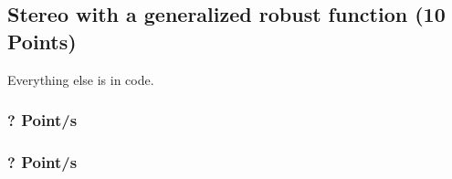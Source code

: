 \newif\ifvimbug
\vimbugfalse

\ifvimbug

\fi


\subsection{Stereo with a generalized robust function (10 Points)}
\setcounter{subsubsection}{4}
Everything else is in code.
\subsubsection{? Point/s}

\subsubsection{? Point/s}
